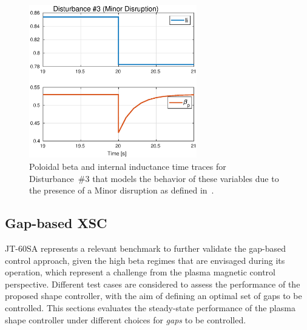 \begin{figure}[h]
	\centering
	\includegraphics[width=0.65\textwidth]{Chp3/Dist_3_minor.eps}
	\caption{Poloidal beta and internal inductance time traces for Disturbance~\#3 that models the behavior of these variables due to the presence of a Minor disruption as defined in~\cite{JT60SA:PID}.	\label{MnrDisrp} }
\end{figure}



\subsection{Gap-based XSC}

JT-60SA represents a relevant benchmark to further validate the gap-based control approach, given the high beta regimes that are envisaged during its operation, which represent a challenge from the plasma magnetic control perspective. Different test cases are considered to assess the performance of the proposed shape controller, with the aim of defining an optimal set of gaps to be controlled. This sections evaluates the steady-state performance of the plasma shape controller under different choices for \emph{gaps} to be controlled. \smallskip

